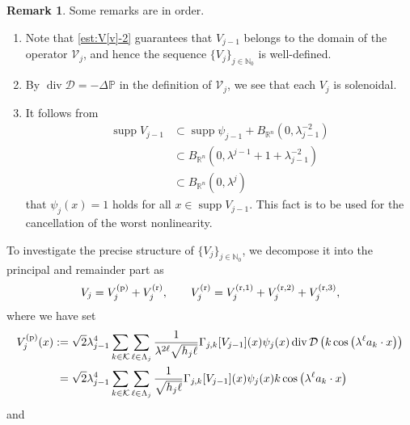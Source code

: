 \documentclass[a4paper,12pt,reqno]{amsart}
\theoremstyle{plain}
\theoremstyle{definition}
\newtheorem{rem}[thm]{Remark}
\renewcommand{\div}{\operatorname{div}}
\newcommand{\supp}{\operatorname{supp}}
\newcommand{\R}{\mathbb{R}}
\newcommand{\N}{\mathbb{N}}
\renewcommand{\sp}[1]{\left(#1\right)}
\begin{document}
\begin{rem}
    Some remarks are in order.
    \begin{enumerate}[label=\arabic*.]
        \item 
        Note that \eqref{est:V[v]-2} guarantees that $V_{j-1}$ belongs to the domain of the operator $\mathcal{V}_j$, and hence the sequence $\{V_j\}_{j\in\N_0}$ is well-defined.
        \item 
        By $\div \mathcal{D}=-\Delta \mathbb{P}$ in the definition of $\mathcal{V}_j$, we see that each $V_j$ is solenoidal.
        \item 
        It follows from 
        \begin{align}
        \supp V_{j-1} 
        &
        \subset \supp \psi_{j-1} + B_{\R^n}(0,\lambda_{j-1}^{-2}) \\
        &
        \subset B_{\R^n}(0,\lambda^{j-1}+1+\lambda_{j-1}^{-2}) 
        \\
        &
        \subset B_{\R^n}(0,\lambda^{j})
        \end{align}
        that $\psi_j(x)=1$ holds for all $x \in \supp V_{j-1}$.
        This fact is to be used for the cancellation of the worst nonlinearity. 
    \end{enumerate}
\end{rem}
To investigate the precise structure of $\{V_j\}_{j \in \N_0}$,
we decompose it into the principal and remainder part as
\begin{align}
    V_{j}=V^{(\rm p)}_{j} + V^{({\rm r})}_{j},
    \qquad
    V^{(\rm r)}_{j}
    =
    V^{({\rm r},1)}_{j}
    +
    V^{({\rm r},2)}_{j}
    +
    V^{({\rm r},3)}_{j},
\end{align}
where we have set 
\begin{align}
    V^{(\rm p)}_{j}(x)
    :={}&
    \sqrt{2}
    \lambda_{j-1}^4
    \sum_{k \in \mathcal{K}}
    \sum_{\ell \in \Lambda_j}
    \frac{1}{\lambda^{2\ell}\sqrt{h_j\ell}}
    \Gamma_{j,k}[V_{j-1}](x)
    \psi_{j}(x)
    \div\mathcal{D}
    \sp{k\cos\sp{\lambda^{\ell}a_k \cdot x}}
    \\
    ={}&
    \sqrt{2}
    \lambda_{j-1}^4
    \sum_{k \in \mathcal{K}}
    \sum_{\ell \in \Lambda_j}
    \frac{1}{\sqrt{h_j\ell}}
    \Gamma_{j,k}[V_{j-1}](x)
    \psi_{j}(x)k
    \cos\sp{\lambda^{\ell}a_k \cdot x}
\end{align}
and
\end{document}
